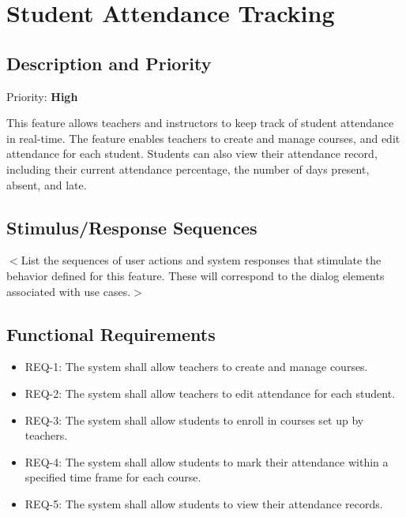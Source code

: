 \documentclass{scrreprt}
\begin{document}
\section{Student Attendance Tracking}


\subsection{Description and Priority}
Priority: \textbf{High}

This feature allows teachers and instructors to keep track of student attendance in real-time.
The feature enables teachers to create and manage courses, and edit attendance for each student.
Students can also view their attendance record, including their current attendance percentage, the number of days present, absent, and late.
\subsection{Stimulus/Response Sequences}
$<$List the sequences of user actions and system responses that stimulate the 
behavior defined for this feature. These will correspond to the dialog elements 
associated with use cases.$>$

\subsection{Functional Requirements}
\begin{itemize}
    \item REQ-1: The system shall allow teachers to create and manage courses.
    \item REQ-2: The system shall allow teachers to edit attendance for each student.
    \item REQ-3: The system shall allow students to enroll in courses set up by teachers. 
    \item REQ-4: The system shall allow students to mark their attendance within a specified time frame for each course.
    \item REQ-5: The system shall allow students to view their attendance records.
\end{itemize}
\end{document}
